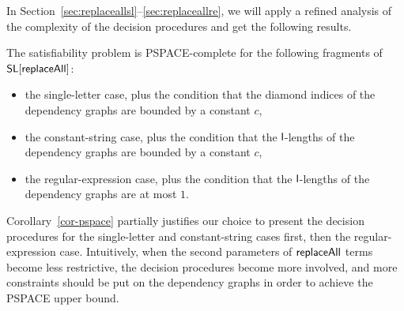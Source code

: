 In Section~\ref{sec:replaceallsl}--\ref{sec:replaceallre}, we will apply a refined analysis of the complexity of the decision procedures and get the following results.

\begin{corollary}\label{cor-pspace}
The satisfiability problem is PSPACE-complete for the following fragments of $\mathsf{SL}[\mathsf{replaceAll}]$:
\begin{itemize}
\item the single-letter case, plus the condition that the diamond indices of the dependency graphs are bounded by a constant $c$, 
%
\item the constant-string case, plus the condition that the $\mathsf{l}$-lengths of the dependency graphs are bounded by a constant $c$, 

%
\item the regular-expression case, plus the condition that the $\mathsf{l}$-lengths of the dependency graphs are at most $1$.
\end{itemize}
\end{corollary}

Corollary~\ref{cor-pspace} partially justifies our choice to present the decision procedures for the single-letter and constant-string cases first, then the regular-expression case. Intuitively, when the second parameters of $\mathsf{replaceAll}$ terms become less restrictive, the decision procedures become more involved, and more constraints should be put on the dependency graphs in order to achieve the PSPACE upper bound.




 


